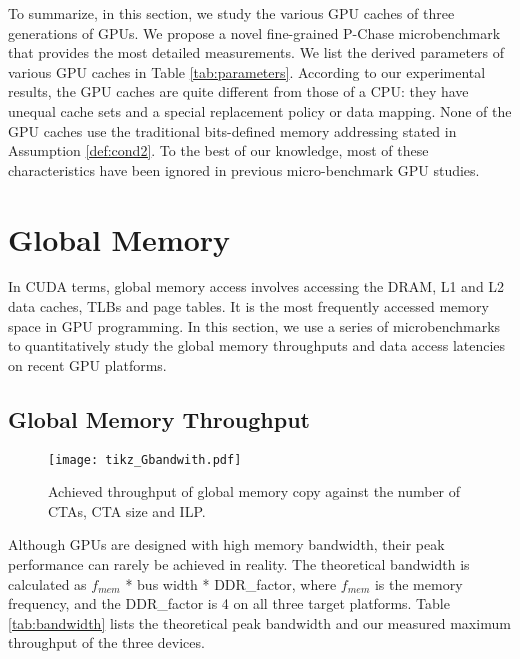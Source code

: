 \documentclass[10pt,journal,compsoc]{IEEEtran}
\theoremstyle{definition}
\begin{document}
\vspace{1em}

To summarize, in this section, we study the various GPU caches of three generations of GPUs. We propose a novel fine-grained P-Chase microbenchmark that provides the most detailed measurements. We list the derived parameters of various GPU caches in Table \ref{tab:parameters}. According to our experimental results, the GPU caches are quite different from those of a CPU: they have unequal cache sets and a special replacement policy or data mapping. None of the GPU caches use the traditional bits-defined memory addressing stated in Assumption \ref{def:cond2}. To the best of our knowledge, most of these characteristics have been ignored in previous micro-benchmark GPU studies.



\section{Global Memory}

In CUDA terms, global memory access involves accessing the DRAM, L1 and L2 data caches, TLBs and page tables. It is the most frequently accessed memory space in GPU programming. In this section, we use a series of microbenchmarks to quantitatively study the global memory throughputs and data access latencies on recent GPU platforms.

\subsection{Global Memory Throughput}
\begin{figure*}
  \centering
\texttt{[image: tikz\_Gbandwith.pdf]}
  \vspace{-1em}
  \caption{Achieved throughput of global memory copy against the number of CTAs, CTA size and ILP. }\label{fig:gbandwidth}
\end{figure*}

Although GPUs are designed with high memory bandwidth, their peak performance can rarely be achieved in reality. The theoretical bandwidth is calculated as $f_{mem}$ * bus width * DDR\_factor, where $f_{mem}$ is the memory frequency, and the DDR\_factor is 4 on all three target platforms. Table \ref{tab:bandwidth} lists the theoretical peak bandwidth and our measured maximum throughput of the three devices.
\end{document}
